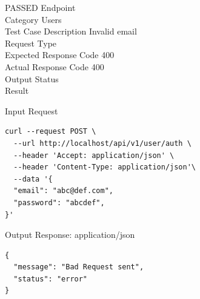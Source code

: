 \begin{testcase}{47}{PASSED}
Endpoint \hfill {}\\
Category \hfill Users\\
Test Case Description \hfill Invalid email\\

Request Type    \hfill {}\\
Expected Response Code    \hfill 400\\
Actual Response Code    \hfill 400\\

Output Status \hfill {}\\
Result \hfill {}

\begin{ipblock}{Input Request}
\begin{verbatim}
curl --request POST \
  --url http://localhost/api/v1/user/auth \
  --header 'Accept: application/json' \
  --header 'Content-Type: application/json'\
  --data '{
  "email": "abc@def.com",
  "password": "abcdef",
}'
\end{verbatim}
\end{ipblock}

\begin{opblock}{Output Response: application/json}
\begin{verbatim}
{
  "message": "Bad Request sent",
  "status": "error"
}
\end{verbatim}
\end{opblock}
\end{testcase}

